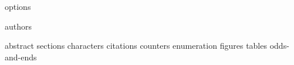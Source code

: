 %
%

{options}

%
%
{authors}

%
%

\title{\fulltitle}

%


%
%

{abstract}
%
%
\keywords{\dockeywords}
{sections}
{characters}
{citations}
{counters}
{enumeration}
{figures}
{tables}
{odds-and-ends}

%
%
\newpage



